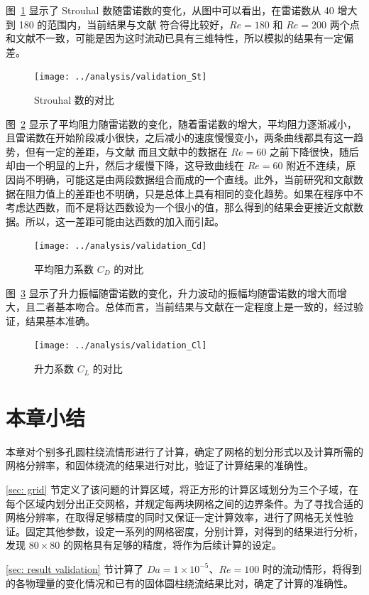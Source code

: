 图~\ref{fig: validation-St} 显示了 Strouhal 数随雷诺数的变化，从图中可以看出，在雷诺数从 40 增大到 180 的范围内，当前结果与文献  符合得比较好，$Re=180$ 和 $Re=200$ 两个点和文献不一致，可能是因为这时流动已具有三维特性，所以模拟的结果有一定偏差。

\begin{figure}
	\centering
	\texttt{[image: ../analysis/validation\_St]}
	\caption{Strouhal 数的对比}
	\label{fig: validation-St}
\end{figure}

图~\ref{fig: validation-Cd} 显示了平均阻力随雷诺数的变化，随着雷诺数的增大，平均阻力逐渐减小，且雷诺数在开始阶段减小很快，之后减小的速度慢慢变小，两条曲线都具有这一趋势，但有一定的差距，与文献  而且文献中的数据在 $Re=60$ 之前下降很快，随后却由一个明显的上升，然后才缓慢下降，这导致曲线在 $Re=60$ 附近不连续，原因尚不明确，可能这是由两段数据组合而成的一个直线。此外，当前研究和文献数据在阻力值上的差距也不明确，只是总体上具有相同的变化趋势。如果在程序中不考虑达西数，而不是将达西数设为一个很小的值，那么得到的结果会更接近文献数据。所以，这一差距可能由达西数的加入而引起。

\begin{figure}[ht]
	\centering
	\texttt{[image: ../analysis/validation\_Cd]}
	\caption{平均阻力系数 $C_D$ 的对比}
	\label{fig: validation-Cd}
\end{figure}

图~\ref{fig: validation-Cl} 显示了升力振幅随雷诺数的变化，升力波动的振幅均随雷诺数的增大而增大，且二者基本吻合。总体而言，当前结果与文献在一定程度上是一致的，经过验证，结果基本准确。

\begin{figure}[ht]
	\centering
	\texttt{[image: ../analysis/validation\_Cl]}
	\caption{升力系数 $C_L$ 的对比}
	\label{fig: validation-Cl}
\end{figure}

\section{本章小结}

本章对个别多孔圆柱绕流情形进行了计算，确定了网格的划分形式以及计算所需的网格分辨率，和固体绕流的结果进行对比，验证了计算结果的准确性。

\ref{sec: grid} 节定义了该问题的计算区域，将正方形的计算区域划分为三个子域，在每个区域内划分出正交网格，并规定每两块网格之间的边界条件。为了寻找合适的网格分辨率，在取得足够精度的同时又保证一定计算效率，进行了网格无关性验证。固定其他参数，设定一系列的网格密度，分别计算，对得到的结果进行分析，发现 $80\times 80$ 的网格具有足够的精度，将作为后续计算的设定。

\ref{sec: result validation} 节计算了 $Da=1\times 10^{-5}$、$Re=100$ 时的流动情形，将得到的各物理量的变化情况和已有的固体圆柱绕流结果比对，确定了计算的准确性。
